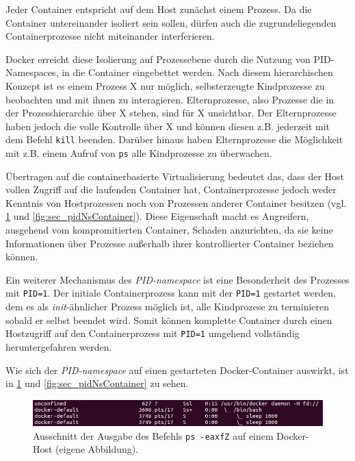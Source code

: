 \documentclass[../main.tex]{subfiles}
\begin{document}
			Jeder Container entspricht auf dem Host zunächst einem Prozess. Da die Container untereinander isoliert sein sollen, dürfen auch die zugrundeliegenden Containerprozesse nicht miteinander interferieren.

			Docker erreicht diese Isolierung auf Prozessebene durch die Nutzung von PID-Namespaces, in die Container eingebettet werden. Nach diesem hierarchischen Konzept ist es einem Prozess X nur möglich, selbsterzeugte Kindprozesse zu beobachten und mit ihnen zu interagieren. Elternprozesse, also Prozesse die in der Prozesshierarchie über X stehen, sind für X unsichtbar. Der Elternprozesse haben jedoch die volle Kontrolle über X und können diesen z.B. jederzeit mit dem Befehl \texttt{kill} beenden. Darüber hinaus haben Elternprozesse die Möglichkeit mit z.B. einem Aufruf von \texttt{ps} alle Kindprozesse zu überwachen.

			Übertragen auf die containerbasierte Virtualisierung bedeutet das, dass der Host vollen Zugriff auf die laufenden Container hat, Containerprozesse jedoch weder Kenntnis von Hostprozessen noch von Prozessen anderer Container besitzen (vgl. \fig \ref{fig:sec_pidNsHost} und \fig \ref{fig:sec_pidNsContainer}). Diese Eigenschaft macht es Angreifern, ausgehend vom kompromitierten Container, Schaden anzurichten, da sie keine Informationen über Prozesse außerhalb ihrer kontrollierter Container beziehen können.

			Ein weiterer Mechanismus des \emph{\acrshort{PID}-namespace} ist eine Besonderheit des Prozesses mit \texttt{PID=1}. Der initiale Containerprozess kann mit der \texttt{PID=1} gestartet werden, dem es als \emph{init}-ähnlicher Prozess möglich ist, alle Kindprozese zu terminieren sobald er selbst beendet wird. Somit können komplette Container durch einen Hostzugriff auf den Containerprozess mit \texttt{PID=1} umgehend vollständig heruntergefahren werden.

			Wie sich der \emph{\acrshort{PID}-namespace} auf einen gestarteten Docker-Container auswirkt, ist in \fig \ref{fig:sec_pidNsHost} und \fig \ref{fig:sec_pidNsContainer} zu sehen.

			\begin{figure}[h]
					\centering
					\includegraphics[width=1.0\textwidth]{./images/sec_pidNsHost.jpg}
					\caption{Ausschnitt der Ausgabe des Befehls \texttt{ps -eaxfZ} auf einem Docker-Host (eigene Abbildung).}
					\label{fig:sec_pidNsHost}
			\end{figure}
\end{document}
